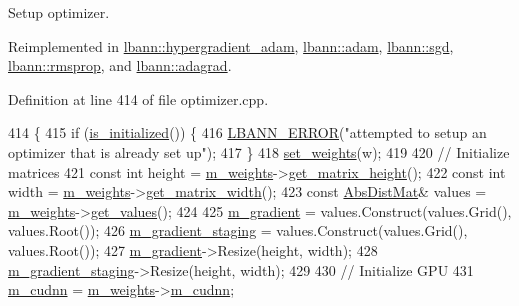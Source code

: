 Setup optimizer. 

Reimplemented in \hyperlink{classlbann_1_1hypergradient__adam_acbc4aa4410eb2e7cb2fd9f423c4909dc}{lbann\+::hypergradient\+\_\+adam}, \hyperlink{classlbann_1_1adam_aea0b1fa44197fe184a6feca5ec5c808e}{lbann\+::adam}, \hyperlink{classlbann_1_1sgd_a616c3cfd457ae1e771710b481b4c1bbb}{lbann\+::sgd}, \hyperlink{classlbann_1_1rmsprop_a8f6111a36f9ad592d14e13b64a0f228f}{lbann\+::rmsprop}, and \hyperlink{classlbann_1_1adagrad_ab027f2979a6df453eb588b1961afd77a}{lbann\+::adagrad}.



Definition at line 414 of file optimizer.\+cpp.


\begin{DoxyCode}
414                                 \{
415   \textcolor{keywordflow}{if} (\hyperlink{classlbann_1_1optimizer_abccf0babf69e3d7c6e9a7fd0731c79b7}{is\_initialized}()) \{
416     \hyperlink{base_8hpp_a80b1d707117e968a6951b7222e4b2b87}{LBANN\_ERROR}(\textcolor{stringliteral}{"attempted to setup an optimizer that is already set up"});
417   \}
418   \hyperlink{classlbann_1_1optimizer_afc00daf2acb6af7e29786524126660c2}{set\_weights}(w);
419 
420   \textcolor{comment}{// Initialize matrices}
421   \textcolor{keyword}{const} \textcolor{keywordtype}{int} height = \hyperlink{classlbann_1_1optimizer_a33b57b578a089d9ffe6715bb3996907c}{m\_weights}->\hyperlink{classlbann_1_1weights_ad36676b9b43bced1cc7e332e3745411f}{get\_matrix\_height}();
422   \textcolor{keyword}{const} \textcolor{keywordtype}{int} width = \hyperlink{classlbann_1_1optimizer_a33b57b578a089d9ffe6715bb3996907c}{m\_weights}->\hyperlink{classlbann_1_1weights_abc3cf3a5b992302b1eaaea1fdf3b377d}{get\_matrix\_width}();
423   \textcolor{keyword}{const} \hyperlink{base_8hpp_a9a697a504ae84010e7439ffec862b470}{AbsDistMat}& values = \hyperlink{classlbann_1_1optimizer_a33b57b578a089d9ffe6715bb3996907c}{m\_weights}->\hyperlink{classlbann_1_1weights_a09fa4082be905c0c124dde3033e2461b}{get\_values}();
424 
425   \hyperlink{classlbann_1_1optimizer_a3df20cb0ae2b60430ad4fd235d66c12e}{m\_gradient} = values.Construct(values.Grid(), values.Root());
426   \hyperlink{classlbann_1_1optimizer_a92cd058d4f9fc8162d36d52461a96df2}{m\_gradient\_staging} = values.Construct(values.Grid(), values.Root());
427   \hyperlink{classlbann_1_1optimizer_a3df20cb0ae2b60430ad4fd235d66c12e}{m\_gradient}->Resize(height, width);
428   \hyperlink{classlbann_1_1optimizer_a92cd058d4f9fc8162d36d52461a96df2}{m\_gradient\_staging}->Resize(height, width);
429 
430   \textcolor{comment}{// Initialize GPU}
431   \hyperlink{classlbann_1_1optimizer_a2f24dbeaca18b06f4aa7d179bbf96680}{m\_cudnn} = \hyperlink{classlbann_1_1optimizer_a33b57b578a089d9ffe6715bb3996907c}{m\_weights}->\hyperlink{classlbann_1_1weights_a873e8c14998915e442d03b8dd7d2fdf7}{m\_cudnn};

\end{DoxyCode}
